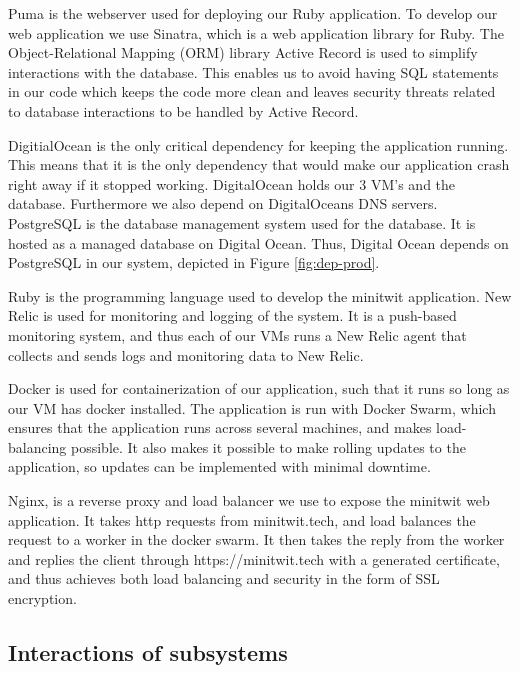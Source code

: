 \documentclass{article}
\begin{document}
Puma is the webserver used for deploying our Ruby application. 
To develop our web application we use Sinatra, which is a web application library for Ruby. 
The Object-Relational Mapping (ORM) library Active Record is used to simplify interactions with the database. This enables us to avoid having SQL statements in our code which keeps the code more clean and leaves security threats related to database interactions to be handled by Active Record. 

DigitialOcean is the only critical dependency for keeping the application running. This means that it is the only dependency that would make our application crash right away if it stopped working. DigitalOcean holds our 3 VM's and the database. Furthermore we also depend on DigitalOceans DNS servers. 
PostgreSQL is the database management system used for the database. It is hosted as a managed database on Digital Ocean. Thus, Digital Ocean depends on PostgreSQL in our system, depicted in Figure \ref{fig:dep-prod}.

Ruby is the programming language used to develop the minitwit application.
New Relic is used for monitoring and logging of the system. It is a push-based monitoring system, and thus each of our VMs runs a New Relic agent that collects and sends logs and monitoring data to New Relic.

Docker is used for containerization of our application, such that it runs so long as our VM has docker installed. The application is run with Docker Swarm, which ensures that the application runs across several machines, and makes load-balancing possible. It also makes it possible to make rolling updates to the application, so updates can be implemented with minimal downtime.

Nginx, is a reverse proxy and load balancer we use to expose the minitwit web application. It takes http requests from minitwit.tech, and load balances the request to a worker in the docker swarm. It then takes the reply from the worker and replies the client through https://minitwit.tech with a generated certificate, and thus achieves both load balancing and security in the form of SSL encryption.



\subsection{Interactions of subsystems}
\end{document}
